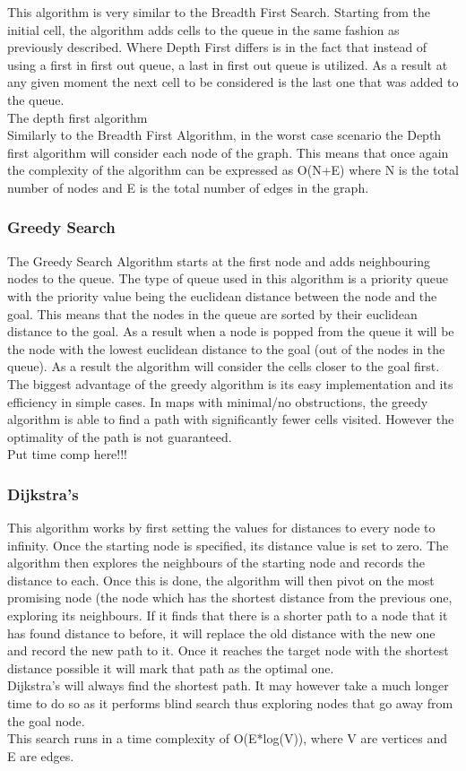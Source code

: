 \documentclass[a4paper,12pt]{article}
\begin{document}
				This algorithm is very similar to the Breadth First Search. Starting from the initial cell, the algorithm adds cells to the queue in the same fashion as previously described. Where Depth First differs is in the fact that instead of using a first in first out queue, a last in first out queue is utilized. As a result at any given moment the next cell to be considered is the last one that was added to the queue. 
				\\
				The depth first algorithm 
				\\
				Similarly to the Breadth First Algorithm, in the worst case scenario the Depth first algorithm will consider each node of the graph. This means that once again the complexity of the algorithm can be expressed as O(N+E) where N is the total number of nodes and E is the total number of edges in the graph.
			
			\subsubsection{Greedy Search}
				The Greedy Search Algorithm starts at the first node and adds neighbouring nodes to the queue. The type of queue used in this algorithm is a priority queue with the priority value being the euclidean distance between the node and the goal. This means that the nodes in the queue are sorted by their euclidean distance to the goal. As a result when a node is popped from the queue it will be the node with the lowest euclidean distance to the goal (out of the nodes in the queue). As a result the algorithm will consider the cells closer to the goal first.
				\\
				The biggest advantage of the greedy algorithm is its easy implementation and its efficiency in simple cases. In maps with minimal/no obstructions, the greedy algorithm is able to find a path with significantly fewer cells visited. However the optimality of the path is not guaranteed.
				\\
				Put time comp here!!!
			\subsubsection{Dijkstra's}
				This algorithm works by first setting the values for distances to every node to infinity. Once the starting node is specified, its distance value is set to zero. The algorithm then explores the neighbours of the starting node and records the distance to each. Once this is done, the algorithm will then pivot on the most promising node (the node which has the shortest distance from the previous one, exploring its neighbours. If it finds that there is a shorter path to a node that it has found distance to before, it will replace the old distance with the new one and record the new path to it. Once it reaches the target node with the shortest distance possible it will mark that path as the optimal one. 
				\\
				Dijkstra's will always find the shortest path. It may however take a much longer time to do so as it performs blind search thus exploring nodes that go away from the goal node. 
				\\
				This search runs in a time complexity of O(E*log(V)), where V are vertices and E are edges. 
\end{document}
